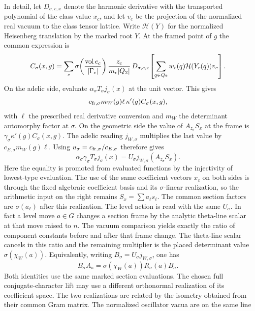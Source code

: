 In detail, let \(D_{\sigma,c,x}\) denote the harmonic
derivative with the transported polynomial of the class
value \(x_c\), and let \(v_c\) be the projection of the
normalized real vacuum to the class tensor lattice.
Write \(\mathcal H(Y)\) for the normalized Heisenberg
translation by the marked root \(Y\). At the framed
point of \(g\) the common expression is
\[
 C_\sigma(x,g)=\sum_c
   \sigma\!\left(\frac{{\rm vol}\,e_c}{|\Gamma_c|}\right)
   \frac{z_c}{m_c |Q_2|}\,
   D_{\sigma,c,x}\!
    \left[\sum_{q\in Q_2}w_c(q)\mathcal H(Y_c(q))v_c\right].
\]
On the adelic side, evaluate \(\alpha_\sigma T_\sigma
j_\sigma(x)\) at the unit vector. This gives
\[
 c_{\rm fr,\sigma}m_W(g)\ell\,\kappa'(g) C_\sigma(x,g),
\]
with \(\ell\) the prescribed real derivative conversion
and \(m_W\) the determinant automorphy factor at
\(\sigma\). On the geometric side the
value of \(A_{z_\sigma}S_x\) at the frame is
\(\gamma_\sigma\kappa'(g)C_\sigma(x,g)\).
The adelic reading \(j_{W,\sigma}\) multiplies the last
value by \(c_{E,\sigma}m_W(g)\ell\).
Using \(u_\sigma=c_{\rm fr,\sigma}/c_{E,\sigma}\)
therefore gives
\begin{equation}
\label{eq:stage-conjugate-fixed-basis}
 \alpha_\sigma\gamma_\sigma T_\sigma j_\sigma(x)
     =U_\sigma j_{W,\sigma}(A_{z_\sigma}S_x).
\end{equation}
Here the equality is promoted from evaluated functions
by the injectivity of lowest-type evaluation. The use
of the same coefficient vectors \(x_c\) on both sides
is through the fixed algebraic coefficient basis and
its \(\sigma\)-linear realization, so the arithmetic
input on the right remains \(S_x=\sum a_\ell s_\ell\).
The common section factors are \(\sigma(a_\ell)\)
after this realization. The level action is read with
the same \(U_\sigma\). In fact a level move \(a\in G\)
changes a section frame by the analytic theta-line
scalar at that move raised to \(n\). The vacuum
comparison yields exactly the ratio of component
constants before and after that frame change. The
theta-line scalar cancels in this ratio and the
remaining multiplier is the placed determinant value
\(\sigma(\chi_W(a))\). Equivalently, writing
\(B_\sigma=U_\sigma j_{W,\sigma}\), one has
\[
 B_\sigma A_a
   =\sigma(\chi_W(a)) R_\sigma(a) B_\sigma .
\]
Both identities use the same marked section
evaluations. The chosen full conjugate-character lift
may use a different orthonormal realization of its
coefficient space. The two realizations are related
by the isometry obtained from their common Gram matrix.
The normalized oscillator vacua are on the same line
